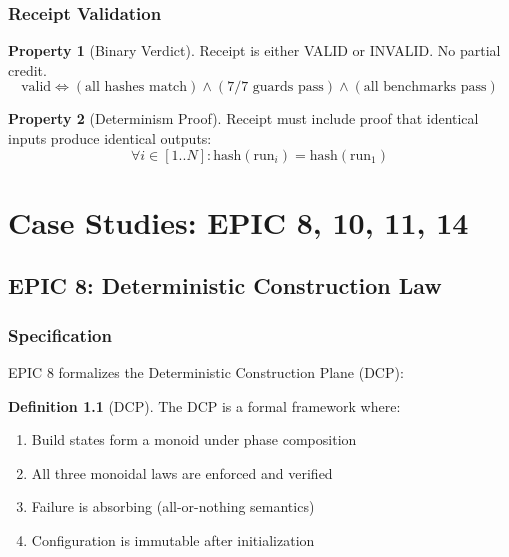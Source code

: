 \documentclass[12pt,oneside,a4paper]{book}
\theoremstyle{definition}
\newtheorem{definition}{Definition}[chapter]
\newtheorem{property}{Property}[chapter]
\begin{document}
\section{Receipt Validation}
\label{sec:receipt-validation}

\begin{property}[Binary Verdict]
Receipt is either VALID or INVALID. No partial credit.
$$\text{valid} \iff (\text{all hashes match}) \land (\text{7/7 guards pass}) \land (\text{all benchmarks pass})$$
\end{property}

\begin{property}[Determinism Proof]
Receipt must include proof that identical inputs produce identical outputs:
$$\forall i \in [1..N]: \text{hash}(\text{run}_i) = \text{hash}(\text{run}_1)$$
\end{property}


\part{Case Studies: EPIC 8, 10, 11, 14}
\label{part:epics}

\chapter{EPIC 8: Deterministic Construction Law}
\label{ch:epic8}


\section{Specification}
\label{sec:epic8-spec}

EPIC 8 formalizes the Deterministic Construction Plane (DCP):

\begin{definition}[DCP]
The DCP is a formal framework where:
\begin{enumerate}
  \item Build states form a monoid under phase composition
  \item All three monoidal laws are enforced and verified
  \item Failure is absorbing (all-or-nothing semantics)
  \item Configuration is immutable after initialization
\end{enumerate}
\end{definition}
\end{document}
